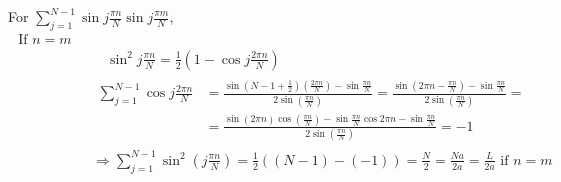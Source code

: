 \documentclass[twoside,10pt]{amsart}
\begin{document}
For $\sum_{j=1}^{N-1} \sin{ j \frac{ \pi n}{ N} } \sin{ j \frac{\pi m}{ N} } $, 
\[
\begin{aligned}
\text{ If $n=m$ } & \\
& \quad \sin^2{ j \frac{ \pi n}{ N} } = \frac{1}{2} ( 1 - \cos{ j \frac{ 2 \pi n }{ N} } )  \\
& \begin{aligned}
  \sum_{j=1}^{N-1} \cos{ j \frac{ 2 \pi n}{ N} } & = \frac{ \sin{ (N-1 + \frac{1}{2} )( \frac{2\pi n}{N} ) } - \sin{ \frac{ \pi n}{ N} } }{ 2 \sin{ \left( \frac{ \pi n}{ N} \right) } } =  \frac{ \sin{ (2\pi n - \frac{ \pi n }{ N} ) }  - \sin{ \frac{ \pi n}{ N} } }{ 2 \sin{ \left( \frac{ \pi n}{ N} \right) } } = \\
  & =  \frac{ \sin{ (2\pi n) }\cos{ \left( \frac{ \pi n}{ N} \right) } - \sin{ \frac{ \pi n}{ N} }\cos{ 2\pi n }  - \sin{ \frac{ \pi n}{ N} } }{ 2 \sin{ \left( \frac{ \pi n}{ N} \right) } } = -1  
\end{aligned} \\
& \Longrightarrow \sum_{j=1}^{N-1} \sin^2{ \left( j \frac{ \pi n}{ N} \right) } = \frac{1}{2} ((N-1)-(-1)) = \frac{N}{2} = \frac{ Na }{2a} = \boxed{ \frac{L}{2a} } \text{ if } n=m
\end{aligned}
\]
\end{document}
